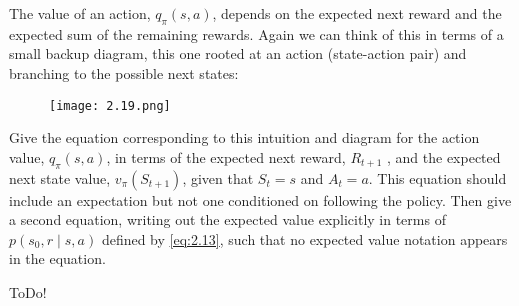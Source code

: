 
\begin{exercise}[Exercise 3.19]

The value of an action, $q_\pi(s, a)$, depends on the expected next reward and the expected sum of the remaining rewards.
Again we can think of this in terms of a small backup diagram, this one rooted at an action (state-action pair) and branching to the possible next states:

\begin{figure}[H]
    \centering
    \texttt{[image: 2.19.png]}
    \caption{}
    \label{fig:2.19}
\end{figure}

Give the equation corresponding to this intuition and diagram for the action value, $q_\pi(s, a)$, in terms of the expected next reward, $R_{t+1}$ , and the expected next state value, $v_\pi(S_{t+1})$, given that $S_t = s$ and $A_t = a$.
This equation should include an expectation but not one conditioned on following the policy.
Then give a second equation, writing out the expected value explicitly in terms of $p(s_0, r \mid s, a)$ defined by \eqref{eq:2.13}, such that no expected value notation appears in the equation.

\end{exercise}


\begin{solution}

ToDo!

\end{solution}


